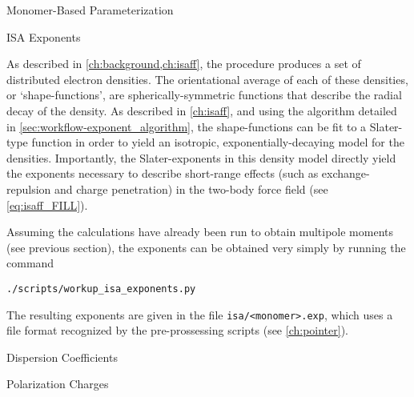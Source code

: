 \begin{section}{Monomer-Based Parameterization}
\begin{subsection}{ISA Exponents}

As described in \cref{ch:background,ch:isaff}, the \isa procedure
produces a set of distributed \aim electron densities. The
orientational average of each of these \aim densities, or
`shape-functions', are spherically-symmetric functions that describe the
radial decay of the \aim density.\cite{Misquitta2014} As described in
\cref{ch:isaff}, and using the algorithm detailed in 
\cref{sec:workflow-exponent_algorithm},
the shape-functions can be fit to a Slater-type function in
order to yield an isotropic, exponentially-decaying model for the \isa
densities. Importantly, the Slater-exponents in this density model directly
yield the exponents necessary to describe short-range effects (such as
exchange-repulsion and charge penetration) in the two-body force
field (see \cref{eq:isaff_FILL}).

Assuming the \isa calculations have already been run to obtain multipole
moments (see previous section), the \isa exponents can be obtained very simply
by running the command
%
\begin{lstlisting}
./scripts/workup_isa_exponents.py
\end{lstlisting}
%
The resulting exponents are given in the file \verb|isa/<monomer>.exp|, which
uses a file format recognized by the \pointer pre-prossessing scripts (see
\cref{ch:pointer}).

\end{subsection}


\begin{subsection}{Dispersion Coefficients}
\label{sec:workflow-dispersion}



\end{subsection}

\begin{subsection}{Polarization Charges}
\label{sec:workflow-polarizabilities}



\end{subsection}

\end{section}
